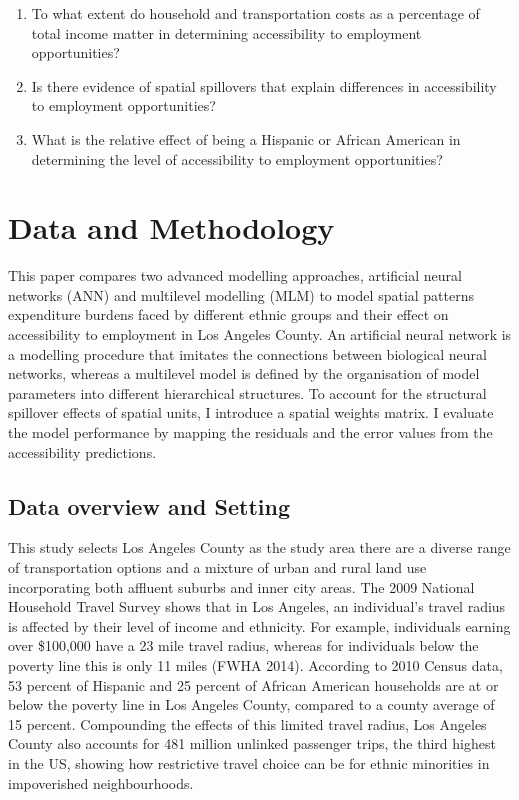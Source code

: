 \documentclass[a4paper,UKenglish]{lipics-v2018}
\begin{document}
\begin{itemize}
\begin{enumerate}
\item \label{itm:first} To what extent do household and transportation costs as a percentage of total income matter in determining accessibility to employment opportunities?
\item \label{itm:second} Is there evidence of spatial spillovers that explain differences in accessibility to employment opportunities?
\item \label{itm:third} What is the relative effect of being a Hispanic or African American in determining the level of accessibility to employment opportunities?
\end{enumerate}
\end{itemize} 


\pagebreak
\section{Data and Methodology}
This paper compares two advanced modelling approaches, artificial neural networks (ANN) and multilevel modelling (MLM) to model spatial patterns expenditure burdens faced by different ethnic groups and their effect on accessibility to employment in Los Angeles County. An artificial neural network is a modelling procedure that imitates the connections between biological neural networks, whereas a multilevel model is defined by the organisation of model parameters into different hierarchical structures. To account for the structural spillover effects of spatial units, I introduce a spatial weights matrix. I evaluate the model performance by mapping the residuals and the error values from the accessibility predictions. 

\subsection{Data overview and Setting}
This study selects Los Angeles County as the study area there are a diverse range of transportation options and a mixture of urban and rural land use incorporating both affluent suburbs and inner city areas. The 2009 National Household Travel Survey shows that in Los Angeles, an individual’s travel radius is affected by their level of income and ethnicity. For example, individuals earning over \$100,000 have a 23 mile travel radius, whereas for individuals below the poverty line this is only 11 miles (FWHA 2014). According to 2010 Census data, 53 percent of Hispanic and 25 percent of African American households are at or below the poverty line in Los Angeles County, compared to a county average of 15 percent. Compounding the effects of this limited travel radius, Los Angeles County also accounts for 481 million unlinked passenger trips, the third highest in the US, showing how restrictive travel choice can be for ethnic minorities in impoverished neighbourhoods. 
\end{document}
